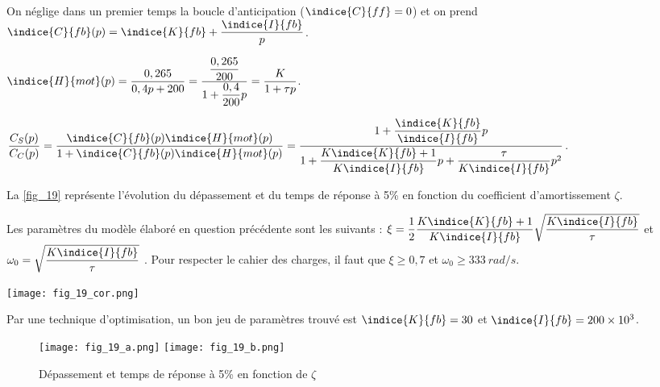 On néglige dans un premier temps la boucle d'anticipation ($\indice{C}{ff} =0$) et on prend
$\indice{C}{fb}( p)=\indice{K}{fb}+\dfrac{\indice{I}{fb}}{p}$.

\ifprof
\begin{corrige}
$\indice{H}{mot} (p)=\dfrac{0,265}{0,4p+200}=\dfrac{\dfrac{0,265}{200}}{1+\dfrac{0,4}{200} p}=\dfrac{K}{1+\tau p}$.

$\dfrac{C_S (p)}{C_C (p)} = \dfrac{\indice{C}{fb} (p) \indice{H}{mot} (p)}{1+\indice{C}{fb} (p) \indice{H}{mot} (p) }=\dfrac{1+\dfrac{\indice{K}{fb}}{\indice{I}{fb}}  p}{1+\dfrac{K\indice{K}{fb}+1}{K\indice{I}{fb}} p+\dfrac{\tau}{K\indice{I}{fb}} p^2}$.
\end{corrige}
\else
\fi

La \autoref{fig_19} représente l'évolution du dépassement et du temps de réponse à 5\% en fonction du
coefficient d'amortissement $\zeta$.

\ifprof
\begin{corrige}
Les paramètres du modèle élaboré en question précédente sont les suivants :
$\xi=\dfrac{1}{2} \dfrac{K\indice{K}{fb}+1}{K\indice{I}{fb}} \sqrt{\dfrac{K\indice{I}{fb}}{\tau}}$
et
$\omega_0=\sqrt{\dfrac{K\indice{I}{fb}}{\tau}}$ .
Pour respecter le cahier des charges, il faut que $\xi \geq 0,7$ et $\omega_0\geq \SI{333}{rad/s}$.

\begin{center}
\texttt{[image: fig\_19\_cor.png]}
\end{center}

Par une technique d’optimisation, un bon jeu de paramètres trouvé est $\indice{K}{fb} = 30$ et $\indice{I}{fb} = 200\times 10^3$.




\end{corrige}
\else
\fi

\ifprof
\else
\begin{figure}[H]
\centering
\texttt{[image: fig\_19\_a.png]}
\texttt{[image: fig\_19\_b.png]}
\caption{Dépassement et temps de réponse à 5\% en fonction de $\zeta$ \label{fig_19}}
\end{figure}


